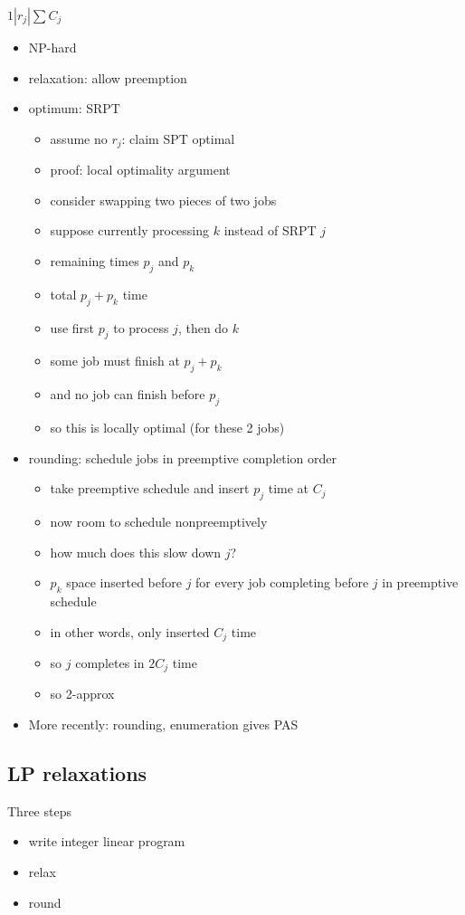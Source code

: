 \documentclass{article}
\begin{document}
$1 | r_j |  \sum C_j$
\begin{itemize}
\item NP-hard
\item relaxation: allow preemption
\item optimum: SRPT
\begin{itemize}
\item assume no $r_j$: claim SPT optimal
\item proof: local optimality argument
\item consider swapping two pieces of two jobs
\item suppose currently processing $k$ instead of SRPT $j$
\item remaining times $p_j$ and $p_k$
\item total $p_j+p_k$ time
\item use first $p_j$ to process $j$, then do $k$
\item some job must finish at $p_j+p_k$
\item and no job can finish before $p_j$
\item so this is locally optimal (for these 2 jobs)
\end{itemize}
\item rounding: schedule jobs in preemptive completion order
\begin{itemize}
\item take preemptive schedule and insert $p_j$ time at $C_j$
\item now room to schedule nonpreemptively
\item how much does this slow down $j$?
\item $p_k$ space inserted before $j$ for every job completing before
  $j$ in preemptive schedule
\item in other words, only inserted $C_j$ time
\item so $j$ completes in $2C_j$ time
\item so 2-approx
\end{itemize}
\item More recently: rounding, enumeration gives PAS
\end{itemize}

\subsection*{LP relaxations}

Three steps
\begin{itemize}
\item write integer linear program
\item relax
\item round
\end{itemize}
\end{document}
